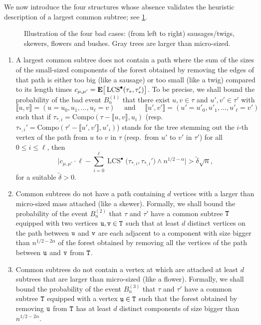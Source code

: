 \documentclass[11pt,reqno]{amsart}
\newcommand{\LCS}{\operatorname{LCS}}
\begin{document}
We now introduce the four structures whose absence validates the heuristic description of a largest common subtree; see \cref{fig:barbecue}.
\medskip

\begin{figure}[b]
    \centering
    
    \caption{Illustration of the four bad cases: (from left to right) sausages/twigs, skewers, flowers and bushes. {Gray trees are larger than micro-sized.}}
    \label{fig:barbecue}
\end{figure}


\begin{enumerate}
    \item[\textbf{Sausage/Twig.}] A largest common subtree does not contain a path where the sum of the sizes of the small-sized components of the forest obtained by removing the edges of that path is either too big (like a sausage) or too small (like a twig) compared to its length times $c_{\mu,\mu'}=\E\big[\LCS^\bullet(\tau_*,\tau_*')\big]$. To be precise, we shall bound the probability of the bad event $B_n^{(1)}$ that there exist $u,v\in \tau$ and $u',v'\in\tau'$ with \[\llbracket u,v\rrbracket=(u=u_0,u_1,\dots, u_\ell=v)\quad\text{ and }\quad\llbracket u',v'\rrbracket=(u'=u'_0,u'_1,\dots, u'_\ell=v')\]
    such that if $\tau_{*,i}=\mathrm{Compo}(\tau-\llbracket u,v \rrbracket, u_i)$ (resp.~$\tau_{*,i}'=\mathrm{Compo}(\tau'-\llbracket u',v' \rrbracket, u'_i)$)  stands for the tree stemming out the $i$-th vertex of the path from $u$ to $v$ in $\tau$ (resp.~from $u'$ to $v'$ in $\tau'$) for all $0\leq i\leq \ell$, then
    \[\bigg|c_{\mu,\mu'}\cdot\ell-\sum_{i=0}^{\ell} \LCS^\bullet\big(\tau_{*,i},\tau_{*,i}')\wedge n^{1/2-\alpha}\bigg|> \tilde{\delta} \sqrt{n},\]
    for a suitable $\tilde{\delta}>0$.
    \item[\textbf{Skewer.}]  Common subtrees do not have a path containing $d$ vertices with a larger than micro-sized mass attached (like a skewer). Formally, we shall bound the probability of the event $B_n^{(2)}$ that $\tau$ and $\tau'$ have a common subtree $\mathtt{T}$ equipped with two vertices $\mathtt{u},\mathtt{v}\in\mathtt{T}$ such that at least $d$ distinct vertices on the path between $\mathtt{u}$ and $\mathtt{v}$ are each adjacent to a component with size bigger than $n^{1/2-2\alpha}$ of the forest obtained by removing all the vertices of the path between $\mathtt{u}$ and $\mathtt{v}$ from $\mathtt{T}$. 
    \item[\textbf{Flower.}] Common subtrees do not contain a vertex at which are attached at least $d$ subtrees that are larger than micro-sized (like a flower). Formally, we shall bound the probability of the event $B_n^{(3)}$ that $\tau$ and $\tau'$ have a common subtree $\mathtt{T}$ equipped with a vertex $\mathtt{u}\in\mathtt{T}$ such that the forest obtained by removing $\mathtt{u}$ from $\mathtt{T}$ has at least $d$ distinct components of size bigger than $n^{1/2-2\alpha}$.

\end{enumerate}
\end{document}
